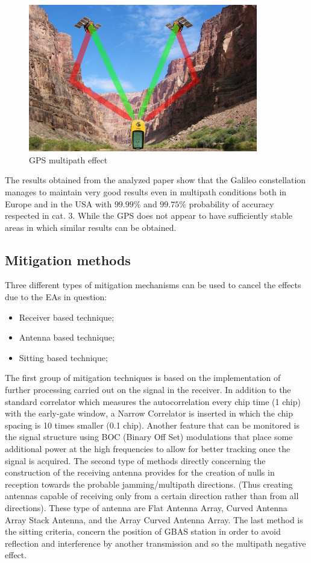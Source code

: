 \documentclass[12pt]{report}
\begin{document}
\begin{figure}[h!]
    \centering
    \includegraphics[width=10cm]{Pictures/Gps-multipath-efect.png}
    \caption{GPS multipath effect}
\end{figure}

The results obtained from the analyzed paper show that the Galileo constellation manages to maintain very good results even in multipath conditions both in Europe and in the USA with $99.99\%$ and $99.75\%$ probability of accuracy respected in cat. 3. While the GPS does not appear to have sufficiently stable areas in which similar results can be obtained. 
\subsection{Mitigation methods}
Three different types of mitigation mechanisms can be used to cancel the effects due to the EAs in question:

\begin{itemize}
     \item Receiver based technique;
         
    \item Antenna based technique;
        
    \item Sitting based technique;
\end{itemize}

The first group of mitigation techniques is based on the implementation of further processing carried out on the signal in the receiver. In addition to the standard correlator which measures the autocorrelation every chip time (1 chip) with the early-gate window, a Narrow Correlator is inserted in which the chip spacing is 10 times smaller (0.1 chip). Another feature that can be monitored is the signal structure using BOC (Binary Off Set) modulations that place some additional power at the high frequencies to allow for better tracking once the signal is acquired. The second type of methods directly concerning the construction of the receiving antenna provides for the creation of nulls in reception towards the probable jamming/multipath directions. (Thus creating antennas capable of receiving only from a certain direction rather than from all directions). These type of antenna are Flat Antenna Array, Curved Antenna Array Stack Antenna, and the Array Curved Antenna Array. The last method is the sitting criteria, concern the position of GBAS station in order to avoid reflection and interference by another transmission and so the multipath negative effect. \newpage
\end{document}
